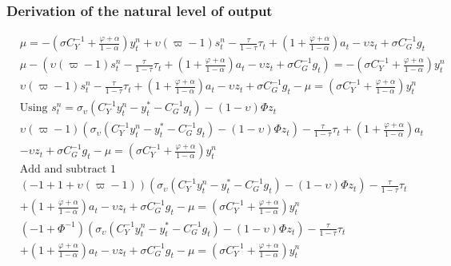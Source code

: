 \subsubsection{Derivation of the natural level of output}
\begin{align} \label{eq:appendix_natural_level_of_output_beginning}
    &\mu = -\left(\sigma C_Y^{-1} + \frac{\varphi + \alpha}{1-\alpha}\right)y^n_t + \upsilon (\varpi - 1) s^n_t - \frac{\tau}{1-\tau}\tau_t  + \left(1 + \frac{\varphi + \alpha}{1-\alpha}\right)a_t - \upsilon z_t + \sigma C_G^{-1} g_t\\
    &\mu - \left( \upsilon (\varpi - 1) s^n_t - \frac{\tau}{1-\tau}\tau_t  + \left(1 + \frac{\varphi + \alpha}{1-\alpha}\right)a_t - \upsilon z_t + \sigma C_G^{-1} g_t \right) = -\left(\sigma C_Y^{-1} + \frac{\varphi + \alpha}{1-\alpha}\right)y^n_t\\
    &\upsilon (\varpi - 1) s^n_t - \frac{\tau}{1-\tau}\tau_t  + \left(1 + \frac{\varphi + \alpha}{1-\alpha}\right)a_t - \upsilon z_t + \sigma C_G^{-1} g_t-\mu = \left(\sigma C_Y^{-1} + \frac{\varphi + \alpha}{1-\alpha}\right)y^n_t\\
    &\text{Using $s^n_t = \sigma_\upsilon(C_Y^{-1} y^n_t - y^*_t - C_G^{-1} g_t) - (1-\upsilon)\Phi z_t$} \nonumber\\
    &\upsilon (\varpi - 1) (\sigma_\upsilon(C_Y^{-1} y^n_t - y^*_t - C_G^{-1} g_t) - (1-\upsilon)\Phi z_t) - \frac{\tau}{1-\tau}\tau_t  + \left(1 + \frac{\varphi + \alpha}{1-\alpha}\right)a_t \nonumber \\ 
        &- \upsilon z_t + \sigma C_G^{-1} g_t-\mu = \left(\sigma C_Y^{-1} + \frac{\varphi + \alpha}{1-\alpha}\right)y^n_t\\
    &\text{Add and subtract 1} \nonumber \\
    &(- 1 + 1 + \upsilon (\varpi - 1)) (\sigma_\upsilon(C_Y^{-1} y^n_t - y^*_t - C_G^{-1} g_t) - (1-\upsilon)\Phi z_t) - \frac{\tau}{1-\tau}\tau_t  \nonumber \\ 
        &+ \left(1 + \frac{\varphi + \alpha}{1-\alpha}\right)a_t - \upsilon z_t + \sigma C_G^{-1} g_t-\mu = \left(\sigma C_Y^{-1} + \frac{\varphi + \alpha}{1-\alpha}\right)y^n_t\\
    &(- 1 + \Phi^{-1}) (\sigma_\upsilon(C_Y^{-1} y^n_t - y^*_t - C_G^{-1} g_t) - (1-\upsilon)\Phi z_t) - \frac{\tau}{1-\tau}\tau_t  \nonumber \\
        &+ \left(1 + \frac{\varphi + \alpha}{1-\alpha}\right)a_t - \upsilon z_t + \sigma C_G^{-1} g_t-\mu = \left(\sigma C_Y^{-1} + \frac{\varphi + \alpha}{1-\alpha}\right)y^n_t\\

\end{align}
